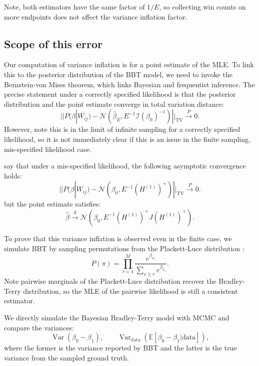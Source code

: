 \documentclass{article}
\DeclareMathOperator{\Var}{Var}
\begin{document}
Note, both estimators have the same factor of $1/E$, so collecting win counts on more endpoints does not affect the variance inflation factor.

\subsection{Scope of this error}
\label{app:scope}
Our computation of variance inflation is for a point estimate of the MLE. To link this to the posterior distribution of the BBT model, we need to invoke the Bernstein-von Mises theorem, which links Bayesian and frequentist inference. The precise statement under a correctly specified likelihood is that the posterior distribution and the point estimate converge in total variation distance:
\begin{equation}
    ||P(\beta|W_{ij}) - \mathcal{N}(\hat{\beta}_E, E^{-1}\mathcal{I}(\beta_0)^{-1})||_{\text{TV}} \xrightarrow{P} 0.
\end{equation}
However, note this is in the limit of infinite sampling for a correctly specified likelihood, so it is not immediately clear if this is an issue in the finite sampling, mis-specified likelihood case.

\citet{kleijn2012} say that under a mis-specified likelihood, the following asymptotic convergence holds:
\begin{equation}
    ||P(\beta |W_{ij}) - \mathcal{N}(\beta_0, E^{-1} (H^{(1)})^+)||_{\text{TV}} \xrightarrow{P} 0.
\end{equation}
but the point estimate satisfies:
\begin{equation}
    \hat{\beta} \xrightarrow{d} \mathcal{N}(\beta_0, E^{-1}(H^{(1)})^+J(H^{(1)})^+).
\end{equation}

To prove that this variance inflation is observed even in the finite case, we simulate BBT by sampling permutations from the Plackett-Luce distribution \citep{plackett1975, luce1959}:
\begin{equation}
    P(\pi) = \prod_{r = 1}^M \frac{e^{\beta_{\pi_r}}}{\sum_{s \geq r}e^{\beta_{\pi_s}}}.
\end{equation}
Note pairwise marginals of the Plackett-Luce distribution recover the Bradley-Terry distribution, so the MLE of the pairwise likelihood is still a consistent estimator.

We directly simulate the Bayesian Bradley-Terry model with MCMC and compare the variances:
\begin{equation}
    \Var(\beta_0 - \beta_1), \qquad \Var_{\text{data}}(\mathbb{E}[\beta_0 - \beta_1 | \text{data}]),
\end{equation}
where the former is the variance reported by BBT and the latter is the true variance from the sampled ground truth. 
\end{document}
